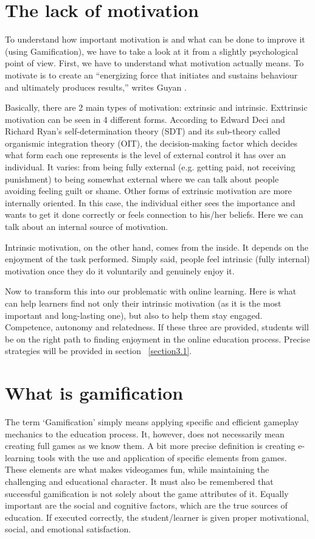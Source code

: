 \documentclass[10pt,english,a4paper]{article}
\begin{document}
\section{The lack of motivation} \label{section2}
	To understand how important motivation is and what can be done to improve it (using Gamification), we have to take a look at it from a slightly psychological point of view. First, we have to understand what motivation actually means. 
	To motivate is to create an “energizing force that initiates and sustains behaviour and ultimately produces results,” writes Guyan \cite{Guyan}. 

	Basically, there are 2 main types of motivation: extrinsic and intrinsic. Exttrinsic motivation can be seen in 4 different forms. 
	According to Edward Deci and Richard Ryan's self-determination theory (SDT) and its sub-theory called organismic integration theory (OIT), the decision-making factor which decides what form each one represents is the level of external control it has over an individual. 
	It varies: from being fully external (e.g. getting paid, not receiving punishment) to being somewhat external where we can talk about people avoiding feeling guilt or shame. Other forms of extrinsic motivation are more internally oriented. 
	In this case, the individual either sees the importance and wants to get it done correctly or feels connection to his/her beliefs. Here we can talk about an internal source of motivation.
	
	Intrinsic motivation, on the other hand, comes from the inside. It depends on the enjoyment of the task performed. Simply said, people feel intrinsic (fully internal) motivation once they do it voluntarily and genuinely enjoy it.

	Now to transform this into our problematic with online learning. Here is what can help learners find not only their intrinsic motivation (as it is the most important and long-lasting one), but also to help them stay engaged. 
	Competence, autonomy and relatedness. If these three are provided, students will be on the right path to finding enjoyment in the online education process.\cite{Guyan} Precise strategies will be provided in section ~\ref{section3.1}.




\section{What is gamification} \label{section3}
	The term ‘Gamification’ simply means applying specific and efficient gameplay mechanics to the education process. It, however, does not necessarily mean creating full games as we know them.\cite{Raymer}
	A bit more precise definition is creating e-learning tools with the use and application of specific elements from games. These elements are what makes videogames fun, while maintaining the challenging and educational character.\cite{Abu-Dawood} 
	It must also be remembered that successful gamification is not solely about the game attributes of it. Equally important are the social and cognitive factors, which are the true sources of education. \cite{Raymer}
	If executed correctly, the student/learner is given proper motivational, social, and emotional satisfaction.\cite{Abu-Dawood} 
\end{document}
